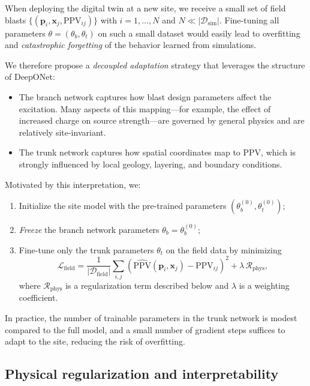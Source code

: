 \documentclass[a4paper,fleqn]{cas-sc}
\begin{document}
When deploying the digital twin at a new site,
we receive a small set of field blasts $\{(\mathbf{p}_i, \mathbf{x}_j, \mathrm{PPV}_{ij})\}$
with $i = 1,\dots,N$ and $N \ll |\mathcal{D}_\mathrm{sim}|$.
Fine-tuning all parameters $\theta = (\theta_b, \theta_t)$ on such a small dataset
would easily lead to overfitting and \emph{catastrophic forgetting} of the behavior learned from simulations.

We therefore propose a \emph{decoupled adaptation} strategy that leverages the structure of DeepONet:
\begin{itemize}
  \item The branch network captures how blast design parameters affect the excitation.
        Many aspects of this mapping---for example, the effect of increased charge on source strength---are governed by general physics and are relatively site-invariant.
  \item The trunk network captures how spatial coordinates map to PPV,
        which is strongly influenced by local geology, layering, and boundary conditions.
\end{itemize}

Motivated by this interpretation, we:
\begin{enumerate}
  \item Initialize the site model with the pre-trained parameters $(\theta_b^{(0)}, \theta_t^{(0)})$;
  \item \emph{Freeze} the branch network parameters $\theta_b = \theta_b^{(0)}$;
  \item Fine-tune only the trunk parameters $\theta_t$ on the field data
        by minimizing
        \begin{equation}
            \mathcal{L}_\mathrm{field}
            = \frac{1}{|\mathcal{D}_\mathrm{field}|}
              \sum_{i,j}
              \left( \hat{\mathrm{PPV}}(\mathbf{p}_i,\mathbf{x}_j) - \mathrm{PPV}_{ij} \right)^2
              + \lambda \, \mathcal{R}_\mathrm{phys},
        \end{equation}
        where $\mathcal{R}_\mathrm{phys}$ is a regularization term described below
        and $\lambda$ is a weighting coefficient.
\end{enumerate}

In practice, the number of trainable parameters in the trunk network is modest compared to the full model,
and a small number of gradient steps suffices to adapt to the site,
reducing the risk of overfitting.

\subsection{Physical regularization and interpretability}
\end{document}
